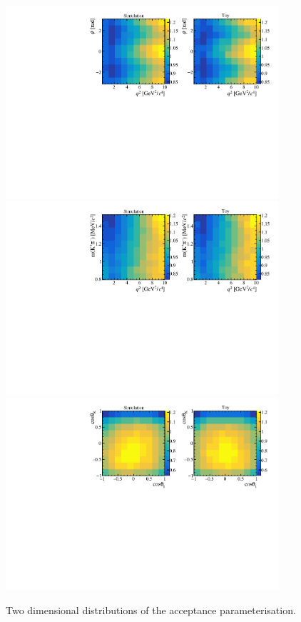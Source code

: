 \begin{figure}[!tb]
 \centering
 \includegraphics[width=0.9\textwidth]{figs/kpimm/acceptance/2d/q2_phi.pdf}
 \includegraphics[width=0.9\textwidth]{figs/kpimm/acceptance/2d/q2_mkpi.pdf}
 \includegraphics[width=0.9\textwidth]{figs/kpimm/acceptance/2d/ctl_ctk.pdf}
 \caption{Two dimensional distributions of the acceptance parameterisation.}
 \label{fig:acceptance:2d_2}
\end{figure}


